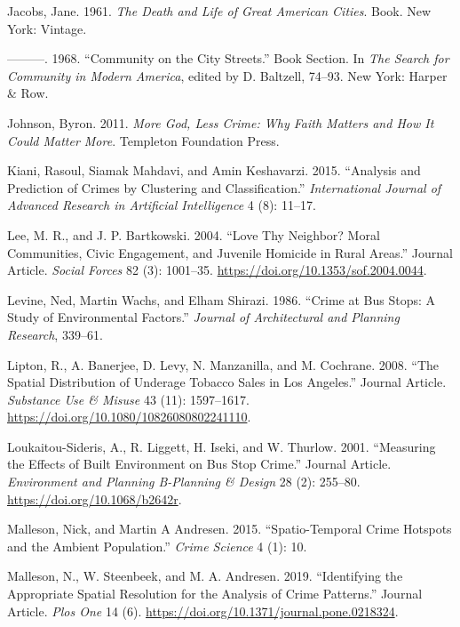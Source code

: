 \documentclass[smallextended]{svjour3}       %
\begin{document}
\leavevmode\hypertarget{ref-Jacobs1961death}{}%
Jacobs, Jane. 1961. \emph{The Death and Life of Great American Cities}.
Book. New York: Vintage.

\leavevmode\hypertarget{ref-Jacobs1968community}{}%
---------. 1968. ``Community on the City Streets.'' Book Section. In
\emph{The Search for Community in Modern America}, edited by D.
Baltzell, 74--93. New York: Harper \& Row.

\leavevmode\hypertarget{ref-Johnson2011more}{}%
Johnson, Byron. 2011. \emph{More God, Less Crime: Why Faith Matters and
How It Could Matter More}. Templeton Foundation Press.

\leavevmode\hypertarget{ref-Kiani2015analysis}{}%
Kiani, Rasoul, Siamak Mahdavi, and Amin Keshavarzi. 2015. ``Analysis and
Prediction of Crimes by Clustering and Classification.''
\emph{International Journal of Advanced Research in Artificial
Intelligence} 4 (8): 11--17.

\leavevmode\hypertarget{ref-Lee2004love}{}%
Lee, M. R., and J. P. Bartkowski. 2004. ``Love Thy Neighbor? Moral
Communities, Civic Engagement, and Juvenile Homicide in Rural Areas.''
Journal Article. \emph{Social Forces} 82 (3): 1001--35.
\url{https://doi.org/10.1353/sof.2004.0044}.

\leavevmode\hypertarget{ref-Levine1986crime}{}%
Levine, Ned, Martin Wachs, and Elham Shirazi. 1986. ``Crime at Bus
Stops: A Study of Environmental Factors.'' \emph{Journal of
Architectural and Planning Research}, 339--61.

\leavevmode\hypertarget{ref-Lipton2008spatial}{}%
Lipton, R., A. Banerjee, D. Levy, N. Manzanilla, and M. Cochrane. 2008.
``The Spatial Distribution of Underage Tobacco Sales in Los Angeles.''
Journal Article. \emph{Substance Use \& Misuse} 43 (11): 1597--1617.
\url{https://doi.org/10.1080/10826080802241110}.

\leavevmode\hypertarget{ref-Loukaitou2001measuring}{}%
Loukaitou-Sideris, A., R. Liggett, H. Iseki, and W. Thurlow. 2001.
``Measuring the Effects of Built Environment on Bus Stop Crime.''
Journal Article. \emph{Environment and Planning B-Planning \& Design} 28
(2): 255--80. \url{https://doi.org/10.1068/b2642r}.

\leavevmode\hypertarget{ref-Malleson2015spatio}{}%
Malleson, Nick, and Martin A Andresen. 2015. ``Spatio-Temporal Crime
Hotspots and the Ambient Population.'' \emph{Crime Science} 4 (1): 10.

\leavevmode\hypertarget{ref-Malleson2019identifying}{}%
Malleson, N., W. Steenbeek, and M. A. Andresen. 2019. ``Identifying the
Appropriate Spatial Resolution for the Analysis of Crime Patterns.''
Journal Article. \emph{Plos One} 14 (6).
\url{https://doi.org/10.1371/journal.pone.0218324}.
\end{document}
